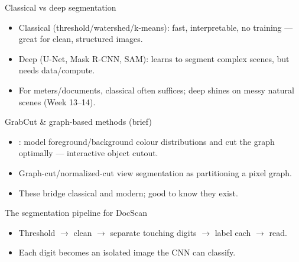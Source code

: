 \documentclass[10pt,aspectratio=169]{beamer}
\begin{document}
\begin{frame}{Classical vs deep segmentation}
  \begin{itemize}
    \item Classical (threshold/watershed/k-means): fast, interpretable, no training — great for clean, structured images.
    \item Deep (U-Net, Mask R-CNN, SAM): learns to segment complex scenes, but needs data/compute.
    \item For meters/documents, classical often suffices; deep shines on messy natural scenes (Week 13--14).
  \end{itemize}
\end{frame}

\begin{frame}{GrabCut \& graph-based methods (brief)}
  \begin{itemize}
    \item {}: model foreground/background colour distributions and cut the graph optimally — interactive object cutout.
    \item Graph-cut/normalized-cut view segmentation as partitioning a pixel graph.
    \item These bridge classical and modern; good to know they exist.
  \end{itemize}
\end{frame}

\begin{frame}{The segmentation pipeline for DocScan}
  \begin{center}
  \end{center}
  \begin{itemize}
    \item Threshold $\rightarrow$ clean $\rightarrow$ separate touching digits $\rightarrow$ label each $\rightarrow$ read.
    \item Each digit becomes an isolated image the CNN can classify.
  \end{itemize}
\end{frame}
\end{document}
